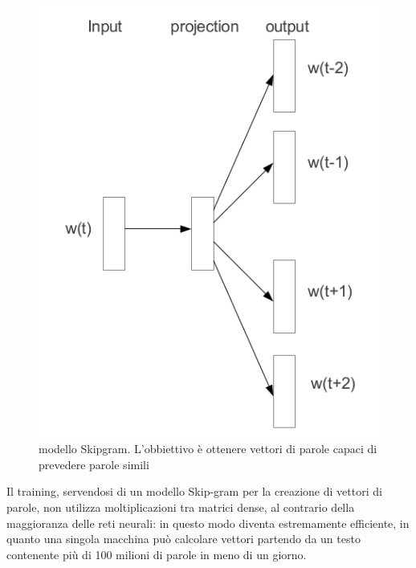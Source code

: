 \documentclass[a4paper,12pt,openright,twoside]{report}
\theoremstyle{definition}
\begin{document}
\begin{figure}[h]
	\centering
	\includegraphics[scale=0.4]{Immagini/skipgram.png}
	\caption{modello Skipgram. L'obbiettivo è ottenere vettori di parole capaci di prevedere
	parole simili}
	\label{fig:skipgram}
\end{figure}

Il training, servendosi di un modello Skip-gram  per la creazione di vettori di parole, 
non utilizza moltiplicazioni tra matrici dense, al contrario della maggioranza delle reti 
neurali: in questo modo diventa estremamente efficiente, in quanto una singola macchina può 
calcolare vettori partendo da un testo contenente più di 100 milioni di parole in meno di un giorno.   
\end{document}
